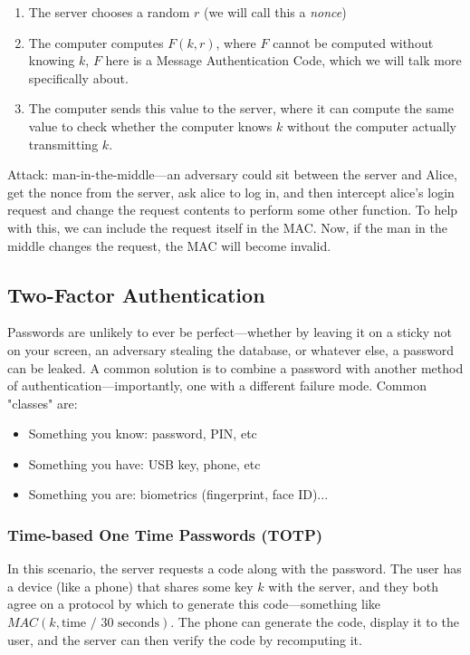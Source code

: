 \begin{enumerate}
	\item The server chooses a random $r$ (we will call this a \textit{nonce})
	\item The computer computes $F(k, r)$, where $F$ cannot be computed without knowing $k$, $F$ here is a Message Authentication Code, which we will talk more specifically about.
	\item The computer sends this value to the server, where it can compute the same value to check whether the computer knows $k$ without the computer actually transmitting $k$.
\end{enumerate}

Attack: man-in-the-middle---an adversary could sit between the server and Alice, get the nonce from the server, ask alice to log in, and then intercept alice's login request and change the request contents to perform some other function. To help with this, we can include the request itself in the MAC. Now, if the man in the middle changes the request, the MAC will become invalid.

\subsection{Two-Factor Authentication}
Passwords are unlikely to ever be perfect---whether by leaving it on a sticky not on your screen, an adversary stealing the database, or whatever else, a password can be leaked. A common solution is to combine a password with another method of authentication---importantly, one with a different failure mode. Common "classes" are:

\begin{itemize}
	\item Something you know: password, PIN, etc
	\item Something you have: USB key, phone, etc
	\item Something you are: biometrics (fingerprint, face ID)...
\end{itemize}

\subsubsection{Time-based One Time Passwords (TOTP)}
In this scenario, the server requests a code along with the password. The user has a device (like a phone) that shares some key $k$ with the server, and they both agree on a protocol by which to generate this code---something like $MAC(k, \text{time / 30 seconds})$. The phone can generate the code, display it to the user, and the server can then verify the code by recomputing it.

